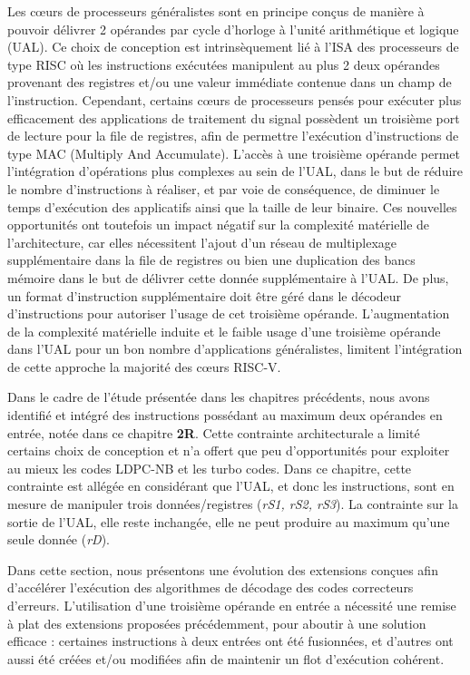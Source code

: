 \documentclass[../main.tex]{subfiles}
\begin{document}
Les cœurs de processeurs généralistes sont en principe conçus de manière à pouvoir délivrer 2 opérandes par cycle d'horloge à l'unité arithmétique et logique (UAL). 
Ce choix de conception est intrinsèquement lié à l'ISA des processeurs de type RISC où les instructions exécutées manipulent au plus 2 deux opérandes provenant des registres et/ou une valeur immédiate contenue dans un champ de l'instruction.
Cependant, certains cœurs de processeurs pensés pour exécuter plus efficacement des applications de traitement du signal possèdent un troisième port de lecture pour la file de registres, afin de permettre l'exécution d'instructions de type MAC (Multiply And Accumulate).
L'accès à une troisième opérande permet l'intégration d'opérations plus complexes au sein de l'UAL, dans le but de réduire le nombre d'instructions à réaliser, et par voie de conséquence, de diminuer le temps d'exécution des applicatifs ainsi que la taille de leur binaire.
Ces nouvelles opportunités ont toutefois un impact négatif sur la complexité matérielle de l'architecture, car elles nécessitent l'ajout d'un réseau de multiplexage supplémentaire dans la file de registres ou bien une duplication des bancs mémoire dans le but de délivrer cette donnée supplémentaire à l'UAL.
De plus, un format d'instruction supplémentaire doit être géré dans le décodeur d'instructions pour autoriser l'usage de cet troisième opérande.
L'augmentation de la complexité matérielle induite et le faible usage d'une troisième opérande dans l'UAL pour un bon nombre d'applications généralistes, limitent l'intégration de cette approche la majorité des cœurs RISC-V.


Dans le cadre de l'étude présentée dans les chapitres précédents, nous avons identifié et intégré des instructions possédant au maximum deux opérandes en entrée, notée dans ce chapitre \textbf{2R}.
Cette contrainte architecturale a limité certains choix de conception et n'a offert que peu d'opportunités pour exploiter au mieux les codes LDPC-NB et les turbo codes.
Dans ce chapitre, cette contrainte est allégée en considérant que l'UAL, et donc les instructions, sont en mesure de manipuler trois données/registres (\textit{rS1, rS2, rS3}).
La contrainte sur la sortie de l'UAL, elle reste inchangée, elle ne peut produire au maximum qu'une seule donnée (\textit{rD}).

Dans cette section, nous présentons une évolution des extensions conçues afin d'accélérer l'exécution des algorithmes de décodage des codes correcteurs d'erreurs.
L'utilisation d'une troisième opérande en entrée a nécessité une remise à plat des extensions proposées précédemment, pour aboutir à une solution efficace : certaines instructions à deux entrées ont été fusionnées, et d'autres ont aussi été créées et/ou modifiées afin de maintenir un flot d'exécution cohérent.
\end{document}
